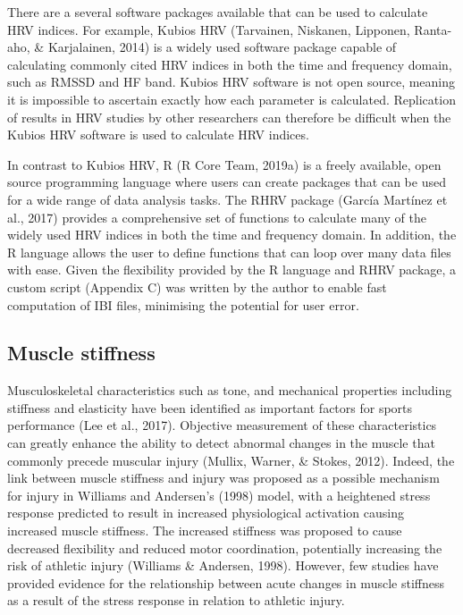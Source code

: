 \documentclass[man,floatsintext]{apa6}
\begin{document}
There are a several software packages available that can be used to calculate HRV indices.
For example, Kubios HRV (Tarvainen, Niskanen, Lipponen, Ranta-aho, \& Karjalainen, 2014) is a widely used software package capable of calculating commonly cited HRV indices in both the time and frequency domain, such as RMSSD and HF band.
Kubios HRV software is not open source, meaning it is impossible to ascertain exactly how each parameter is calculated.
Replication of results in HRV studies by other researchers can therefore be difficult when the Kubios HRV software is used to calculate HRV indices.

In contrast to Kubios HRV, R (R Core Team, 2019a) is a freely available, open source programming language where users can create packages that can be used for a wide range of data analysis tasks.
The RHRV package (García Martínez et al., 2017) provides a comprehensive set of functions to calculate many of the widely used HRV indices in both the time and frequency domain. In addition, the R language allows the user to define functions that can loop over many data files with ease.
Given the flexibility provided by the R language and RHRV package, a custom script (Appendix C) was written by the author to enable fast computation of IBI files, minimising the potential for user error.

\hypertarget{muscle-stiffness}{%
\subsection{Muscle stiffness}\label{muscle-stiffness}}

Musculoskeletal characteristics such as tone, and mechanical properties including stiffness and elasticity have been identified as important factors for sports performance (Lee et al., 2017).
Objective measurement of these characteristics can greatly enhance the ability to detect abnormal changes in the muscle that commonly precede muscular injury (Mullix, Warner, \& Stokes, 2012).
Indeed, the link between muscle stiffness and injury was proposed as a possible mechanism for injury in Williams and Andersen's (1998) model, with a heightened stress response predicted to result in increased physiological activation causing increased muscle stiffness.
The increased stiffness was proposed to cause decreased flexibility and reduced motor coordination, potentially increasing the risk of athletic injury (Williams \& Andersen, 1998).
However, few studies have provided evidence for the relationship between acute changes in muscle stiffness as a result of the stress response in relation to athletic injury.
\end{document}
